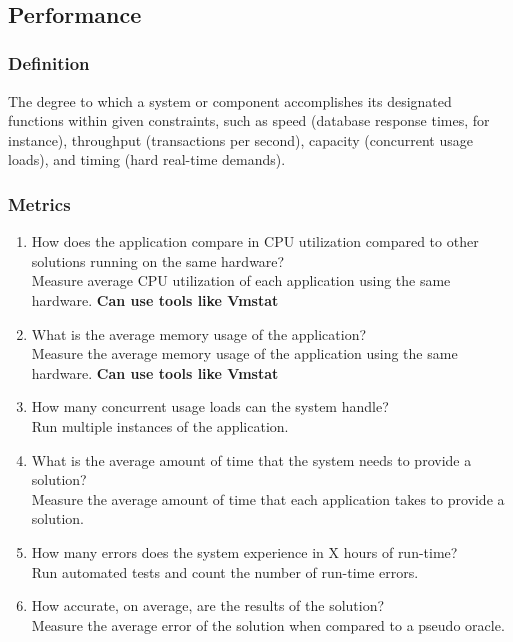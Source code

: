 \documentclass{article}
\begin{document}
~\newpage

\subsection{Performance}
\subsubsection{Definition}
The degree to which a system or component accomplishes its designated functions within given constraints, such as speed (database response times, for instance), throughput (transactions per second), capacity (concurrent usage loads), and timing (hard real-time demands).

\subsubsection{Metrics}

\begin{enumerate}
	\item How does the application compare in CPU utilization compared to other solutions running on the same hardware?\\
	
	Measure average CPU utilization of each application using the same hardware.
	\textbf{Can use tools like Vmstat}
	
	\item What is the average memory usage of the application?\\
	
	Measure the average memory usage of the application using the same hardware.
	\textbf{Can use tools like Vmstat}
	
	\item How many concurrent usage loads can the system handle?\\
	
	Run multiple instances of the application. 
	\item What is the average amount of time that the system needs to provide a solution?\\
	
	Measure the average amount of time that each application takes to provide a solution.
	\item How many errors does the system experience in X hours of run-time?\\
	
	Run automated tests and count the number of run-time errors.
	\item How accurate, on average, are the results of the solution?\\
	
	Measure the average error of the solution when compared to a pseudo oracle.
\end{enumerate}
\end{document}

